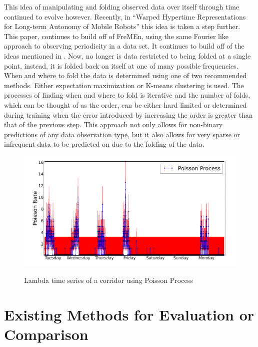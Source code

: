   This idea of manipulating and folding observed data over itself through time
  continued to evolve however. Recently, in
  ``Warped Hypertime Representations for Long-term Autonomy of Mobile Robots''
  \cite{krajnik2018} this idea is taken a step further. This paper, continues
  to build off of FreMEn, using the same Fourier like approach to observing
  periodicity in a data set. It continues to build off of the ideas mentioned
  in \cite{Jovan2016}. Now, no longer is data restricted to being folded at a
  single point, instead, it is folded back on itself at one of many possible
  frequencies. When and where to fold the data is determined using one of two
  recommended methods. Either expectation maximization or K-means clustering is
  used. The processes of finding when and where to fold is iterative and the number
  of folds, which can be thought of as the order, can be either hard limited
  or determined during training when the error introduced by increasing the
  order is greater than that of the previous step. This approach not only allows
  for non-binary predictions of any data observation type, but it also allows
  for very sparse or infrequent data to be predicted on due to the folding of
  the data.



  \begin{figure}[!htb]
    \centering
    \includegraphics[width=\linewidth]{images/poisson-spectral-process.png}
    \caption{Lambda time series of a corridor using Poisson Process}
    \cite{Jovan2016}
    \label{figure:PSP}
  \end{figure}


  \section{ Existing Methods for Evaluation or Comparison }

